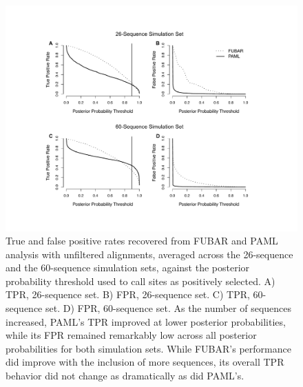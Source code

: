 \documentclass[10pt]{article}
\begin{document}
\begin{figure}[H]
\centerline{\includegraphics[width=7in]{Figures/tprfpr.pdf}}
\caption{\label{tprfpr} True and false positive rates recovered from FUBAR and PAML analysis with unfiltered alignments, averaged across the 26-sequence and the 60-sequence simulation sets, against the posterior probability threshold used to call sites as positively selected. A) TPR, 26-sequence set. B) FPR, 26-sequence set. C) TPR, 60-sequence set. D) FPR, 60-sequence set.  As the number of sequences increased, PAML's TPR improved at lower posterior probabilities, while its FPR remained remarkably low across all posterior probabilities for both simulation sets. While FUBAR's performance did improve with the inclusion of more sequences, its overall TPR behavior did not change as dramatically as did PAML's.}
\end{figure}
\end{document}
